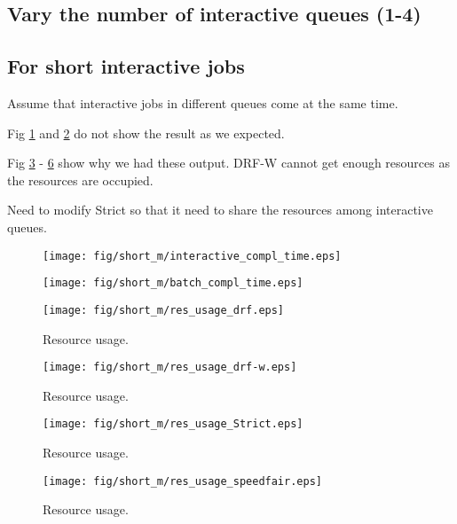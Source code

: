 \subsection{Vary the number of interactive queues (1-4)}


\subsection{For short interactive jobs}

Assume that interactive jobs in different queues come at the same time. 

Fig \ref{fig:short_m_interactive_compl_time} and \ref{fig:short_m_batch_compl_time} do not show the result as we expected.

Fig \ref{fig:short_m_res_usage_drf} - \ref{fig:short_m_res_usage_speedfair} show why we had these output. DRF-W cannot get enough resources as the resources are occupied. 

Need to modify Strict so that it need to share the resources among interactive queues.

\begin{figure}
	\centering
	\texttt{[image: fig/short\_m/interactive\_compl\_time.eps]}
	\caption{}
	\label{fig:short_m_interactive_compl_time}
\end{figure}

\begin{figure}
	\centering
	\texttt{[image: fig/short\_m/batch\_compl\_time.eps]}
	\caption{}
	\label{fig:short_m_batch_compl_time}
\end{figure}


\begin{figure}
	\centering
	\texttt{[image: fig/short\_m/res\_usage\_drf.eps]}
	\caption{Resource usage.}
	\label{fig:short_m_res_usage_drf}
\end{figure}

\begin{figure}
	\centering
	\texttt{[image: fig/short\_m/res\_usage\_drf-w.eps]}
	\caption{Resource usage.}
	\label{fig:short_m_res_usage_drf-w}
\end{figure}

\begin{figure}
	\centering
	\texttt{[image: fig/short\_m/res\_usage\_Strict.eps]}
	\caption{Resource usage.}
	\label{fig:short_m_res_usage_Strict}
\end{figure}

\begin{figure}
	\centering
	\texttt{[image: fig/short\_m/res\_usage\_speedfair.eps]}
	\caption{Resource usage.}
	\label{fig:short_m_res_usage_speedfair}
\end{figure}


